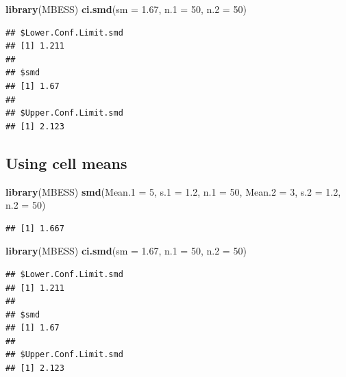 \documentclass[
]{krantz}
\makeatletter
\newenvironment{Shaded}{\begin{snugshade}}{\end{snugshade}}
\newcommand{\DataTypeTok}[1]{\textcolor[rgb]{0.27,0.27,0.27}{#1}}
\newcommand{\DecValTok}[1]{\textcolor[rgb]{0.06,0.06,0.06}{#1}}
\newcommand{\FloatTok}[1]{\textcolor[rgb]{0.06,0.06,0.06}{#1}}
\newcommand{\KeywordTok}[1]{\textcolor[rgb]{0.27,0.27,0.27}{\textbf{#1}}}
\newcommand{\NormalTok}[1]{#1}
\newenvironment{kframe}{%
\medskip{}
\setlength{\fboxsep}{.8em}
 \def\at@end@of@kframe{}%
 \ifinner\ifhmode%
  \def\at@end@of@kframe{\end{minipage}}%
  \begin{minipage}{\columnwidth}%
 \fi\fi%
 \def\FrameCommand##1{\hskip\@totalleftmargin \hskip-\fboxsep
 \colorbox{shadecolor}{##1}\hskip-\fboxsep
     \hskip-\linewidth \hskip-\@totalleftmargin \hskip\columnwidth}%
 \MakeFramed {\advance\hsize-\width
   \@totalleftmargin\z@ \linewidth\hsize
   \@setminipage}}%
 {\par\unskip\endMakeFramed%
 \at@end@of@kframe}
\renewenvironment{Shaded}{\begin{kframe}}{\end{kframe}}
\makeatother
\begin{document}
\begin{Shaded}
\begin{Highlighting}[]
\KeywordTok{library}\NormalTok{(MBESS)}
\KeywordTok{ci.smd}\NormalTok{(}\DataTypeTok{sm =} \FloatTok{1.67}\NormalTok{, }\DataTypeTok{n.1 =} \DecValTok{50}\NormalTok{, }\DataTypeTok{n.2 =} \DecValTok{50}\NormalTok{) }
\end{Highlighting}
\end{Shaded}

\begin{verbatim}
## $Lower.Conf.Limit.smd
## [1] 1.211
## 
## $smd
## [1] 1.67
## 
## $Upper.Conf.Limit.smd
## [1] 2.123
\end{verbatim}

\hypertarget{using-cell-means}{%
\subsection{Using cell means}\label{using-cell-means}}

\begin{Shaded}
\begin{Highlighting}[]
\KeywordTok{library}\NormalTok{(MBESS)}
\KeywordTok{smd}\NormalTok{(}\DataTypeTok{Mean.1 =} \DecValTok{5}\NormalTok{,}
    \DataTypeTok{s.1 =} \FloatTok{1.2}\NormalTok{, }
    \DataTypeTok{n.1 =} \DecValTok{50}\NormalTok{, }
    \DataTypeTok{Mean.2 =} \DecValTok{3}\NormalTok{, }
    \DataTypeTok{s.2 =} \FloatTok{1.2}\NormalTok{, }
    \DataTypeTok{n.2 =} \DecValTok{50}\NormalTok{) }
\end{Highlighting}
\end{Shaded}

\begin{verbatim}
## [1] 1.667
\end{verbatim}

\begin{Shaded}
\begin{Highlighting}[]
\KeywordTok{library}\NormalTok{(MBESS)}
\KeywordTok{ci.smd}\NormalTok{(}\DataTypeTok{sm =} \FloatTok{1.67}\NormalTok{, }\DataTypeTok{n.1 =} \DecValTok{50}\NormalTok{, }\DataTypeTok{n.2 =} \DecValTok{50}\NormalTok{) }
\end{Highlighting}
\end{Shaded}

\begin{verbatim}
## $Lower.Conf.Limit.smd
## [1] 1.211
## 
## $smd
## [1] 1.67
## 
## $Upper.Conf.Limit.smd
## [1] 2.123
\end{verbatim}
\end{document}

